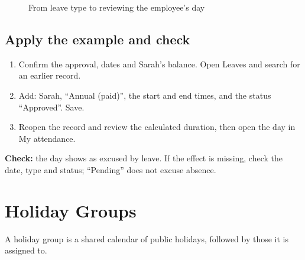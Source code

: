 \begin{figure}[H]
\centering
{}
\rclegend
\caption{From leave type to reviewing the employee’s day}
\label{fig:hr-leave-flow}
\end{figure}

\subsection{Apply the example and check}

\begin{enumerate}
  \item Confirm the approval, dates and Sarah's balance. Open Leaves and search for an earlier record.
  \item Add: Sarah, “Annual (paid)”, the start and end times, and the status “Approved”. Save.
  \item Reopen the record and review the calculated duration, then open the day in My attendance.
\end{enumerate}

\textbf{Check:} the day shows as excused by leave. If the effect is missing, check the date, type and status; “Pending” does not excuse absence.

\clearpage
\section{Holiday Groups}
\label{sec:hr-feature-holiday-groups}

A holiday group is a shared calendar of public holidays, followed by those it is assigned to.

